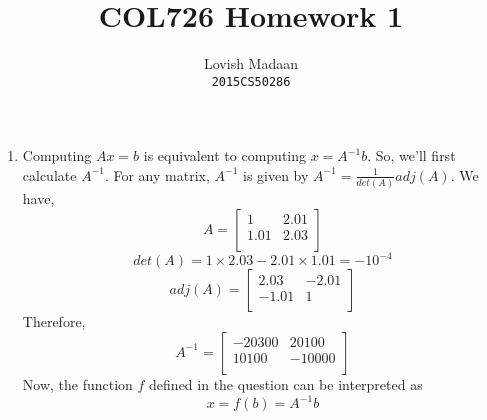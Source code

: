 \documentclass{article}
\title{COL726 Homework 1}
\author{Lovish Madaan \\ \texttt{2015CS50286}}
\date{}
\begin{document}
\maketitle

\begin{enumerate}
    \item Computing $Ax = b$ is equivalent to computing $x = A^{-1}b$. So, we'll first calculate $A^{-1}$. For any matrix, $A^{-1 }$ is given by $A^{-1} = \frac{1}{det(A)}adj(A)$. We have,
    $$A = \begin{bmatrix}
        1 & 2.01\\
        1.01 & 2.03\\
    \end{bmatrix}$$
    $$det(A) = 1 \times 2.03 - 2.01 \times 1.01 = -10^{-4}$$
    $$adj(A) = \begin{bmatrix}
        2.03 & -2.01\\
        -1.01 & 1\\
    \end{bmatrix}$$
    Therefore,
    $$A^{-1} = \begin{bmatrix}
        -20300 & 20100\\
        10100 & -10000\\
    \end{bmatrix}$$
    Now, the function $f$ defined in the question can be interpreted as
    $$x = f(b) = A^{-1}b$$
\end{enumerate}
\end{document}
